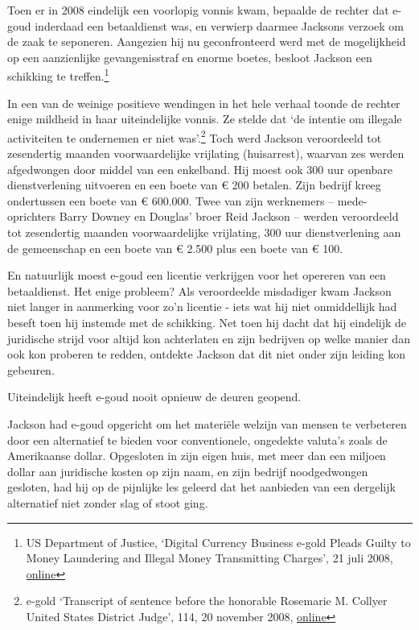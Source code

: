 \documentclass[smalldemyvopaper,11pt,twoside,onecolumn,openright,extrafontsizes,hidelinks]{memoir}
\begin{document}
Toen er in 2008 eindelijk een voorlopig vonnis kwam, bepaalde de rechter
dat e-goud inderdaad een betaaldienst was, en verwierp daarmee Jacksons
verzoek om de zaak te seponeren. Aangezien hij nu geconfronteerd werd
met de mogelijkheid op een aanzienlijke gevangenisstraf en enorme
boetes, besloot Jackson een schikking te treffen.\footnote{\hspace{0pt}US
  Department of Justice, `Digital Currency Business e-gold Pleads Guilty
  to Money Laundering and Illegal Money Transmitting Charges', 21 juli
  2008,
  \href{https://www.justice.gov/archive/opa/pr/2008/July/08-crm-635.html}{online}}

In een van de weinige positieve wendingen in het hele verhaal toonde de
rechter enige mildheid in haar uiteindelijke vonnis. Ze stelde dat `de
intentie om illegale activiteiten te ondernemen er niet was'.\footnote{\hspace{0pt}e-gold
  `Transcript of sentence before the honorable Rosemarie M. Collyer
  United States District Judge', 114, 20 november 2008,
  \href{https://legalupdate.e-gold.com/2008/11/transcript-of-sentence-before-the-honorable-rosemarie-m-collyer-united-states-district-judge.html}{online}}
Toch werd Jackson veroordeeld tot zesendertig maanden voorwaardelijke
vrijlating (huisarrest), waarvan zes werden afgedwongen door middel van
een enkelband. Hij moest ook 300 uur openbare dienstverlening uitvoeren
en een boete van € 200 betalen. Zijn bedrijf kreeg ondertussen een boete
van € 600.000. Twee van zijn werknemers -- mede-oprichters Barry Downey
en Douglas' broer Reid Jackson -- werden veroordeeld tot zesendertig
maanden voorwaardelijke vrijlating, 300 uur dienstverlening aan de
gemeenschap en een boete van € 2.500 plus een boete van € 100.

En natuurlijk moest e-goud een licentie verkrijgen voor het opereren van
een betaaldienst. Het enige probleem? Als veroordeelde misdadiger kwam
Jackson niet langer in aanmerking voor zo'n licentie - iets wat hij niet
onmiddellijk had beseft toen hij instemde met de schikking. Net toen hij
dacht dat hij eindelijk de juridische strijd voor altijd kon achterlaten
en zijn bedrijven op welke manier dan ook kon proberen te redden,
ontdekte Jackson dat dit niet onder zijn leiding kon gebeuren.

Uiteindelijk heeft e-goud nooit opnieuw de deuren geopend.

Jackson had e-goud opgericht om het materiële welzijn van mensen te
verbeteren door een alternatief te bieden voor conventionele, ongedekte
valuta's zoals de Amerikaanse dollar. Opgesloten in zijn eigen huis, met
meer dan een miljoen dollar aan juridische kosten op zijn naam, en zijn
bedrijf noodgedwongen gesloten, had hij op de pijnlijke les geleerd dat
het aanbieden van een dergelijk alternatief niet zonder slag of stoot
ging.
\end{document}
